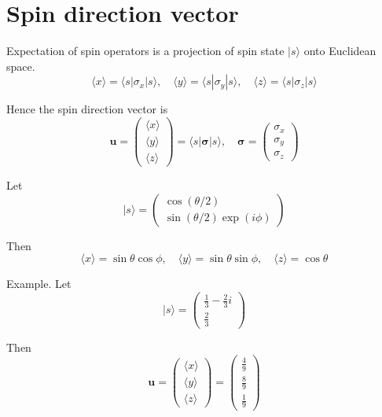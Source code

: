 

\section*{Spin direction vector}

Expectation of spin operators is a projection of spin state $|s\rangle$ onto Euclidean space.
\begin{equation*}
\langle x\rangle=\langle s|\sigma_x|s\rangle,
\quad
\langle y\rangle=\langle s|\sigma_y|s\rangle,
\quad
\langle z\rangle=\langle s|\sigma_z|s\rangle
\end{equation*}

Hence the spin direction vector is
\begin{equation*}
\mathbf u=\begin{pmatrix}\langle x\rangle\\\langle y\rangle\\\langle z\rangle\end{pmatrix}
=\langle s|\boldsymbol\sigma|s\rangle,
\quad
\boldsymbol\sigma=\begin{pmatrix}\sigma_x\\\sigma_y\\\sigma_z\end{pmatrix}
\end{equation*}

Let
\begin{equation*}
|s\rangle=\begin{pmatrix}\cos(\theta/2)\\\sin(\theta/2)\exp(i\phi)\end{pmatrix}
\end{equation*}

Then
\begin{equation*}
\langle x\rangle=\sin\theta\cos\phi,\quad
\langle y\rangle=\sin\theta\sin\phi,\quad
\langle z\rangle=\cos\theta
\end{equation*}

Example. Let
\begin{equation*}
|s\rangle=\begin{pmatrix}\frac{1}{3}-\frac{2}{3}i\\[1ex]\frac{2}{3}\end{pmatrix}
\end{equation*}

Then
\begin{equation*}
\mathbf u
=\begin{pmatrix}\langle x\rangle\\\langle y\rangle\\\langle z\rangle\end{pmatrix}
=\begin{pmatrix}\frac{4}{9}\\[1ex]\frac{8}{9}\\[1ex]\frac{1}{9}\end{pmatrix}
\end{equation*}

